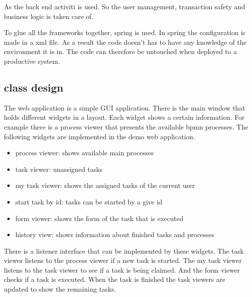 \documentclass[paper=a4,twoside=false,BCOR=0mm,DIV=calc,fontsize=12pt]{scrartcl}
\begin{document}
As the back end activiti is used. So the user management, transaction safety and business logic is taken care of.

To glue all the frameworks together, spring is used. In spring the configuration is made in a xml file. As a result the code doesn't has to have any 
knowledge of the environment it is in. The code can therefore be untouched when deployed to a productive system.


\subsection{class design}
The web application is a simple GUI application. There is the main window that holds different widgets in a layout. Each widget shows a certain
information. For example there is a process viewer that presents the available bpmn processes. 
The following widgets are implemented in the demo web application.

\begin{itemize}
 \item process viewer: shows available main processes
 \item task viewer: unassigned tasks
 \item my task viewer: shows the assigned tasks of the current user
 \item start task by id: tasks can be started by a give id
 \item form viewer: shows the form of the task that is executed
 \item history view: shows information about finished tasks and processes
\end{itemize}

There is a listener interface that can be implemented by these widgets. The task viewer listens to the process viewer if a new task is started. The
my task viewer listens to the task viewer to see if a task is being claimed. And the form viewer checks if a task is executed. When the task is
finished the task viewers are updated to show the remaining tasks.
\end{document}
